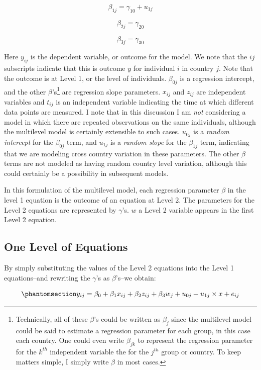 \documentclass[
  letterpaper,
  DIV=11,
  numbers=noendperiod]{scrreprt}
\begin{document}
\[\beta_{1j} = \gamma_{10} + u_{1j}\]

\[\beta_{2j} = \gamma_{20}\]

\[\beta_{3j} = \gamma_{30}\]

Here \(y_{ij}\) is the dependent variable, or outcome for the model. We
note that the \(ij\) subscripts indicate that this is outcome \(y\) for
individual \(i\) in country \(j\). Note that the outcome is at Level 1,
or the level of individuals. \(\beta_{0j}\) is a regression intercept,
and the other \(\beta\)'s\footnote{Technically, all of these \(\beta\)'s
  could be written as \(\beta_j\) since the multilevel model could be
  said to estimate a regression parameter for each group, in this case
  each country. One could even write \(\beta_{jk}\) to represent the
  regression parameter for the \(k^{th}\) independent variable the for
  the \(j^{th}\) group or country. To keep matters simple, I simply
  write \(\beta\) in most cases.} are regression slope parameters.
\(x_{ij}\) and \(z_{ij}\) are independent variables and \(t_{ij}\) is an
independent variable indicating the time at which different data points
are measured. I note that in this discussion I am \emph{not} considering
a model in which there are repeated observations on the same
individuals, although the multilevel model is certainly extensible to
such cases. \(u_{0j}\) is a \emph{random intercept} for the
\(\beta_{0j}\) term, and \(u_{1j}\) is a \emph{random slope} for the
\(\beta_{1j}\) term, indicating that we are modeling cross country
variation in these parameters. 
 The other \(\beta\) terms are not modeled as having
random country level variation, although this could certainly be a
possibility in subsequent models.

In this formulation of the multilevel model, each regression parameter
\(\beta\) in the level 1 equation is the outcome of an equation at Level
2. The parameters for the Level 2 equations are represented by
\(\gamma\)'s. \(w\) a Level 2 variable appears in the first Level 2
equation.

\subsection{One Level of Equations}\label{one-level-of-equations}

By simply substituting the values of the Level 2 equations into the
Level 1 equations--and rewriting the \(\gamma\)'s as \(\beta\)'s--we
obtain:

\begin{equation}\phantomsection\label{eq-MLM}{y_{ij} = \beta_0 + \beta_1 x_{ij} + \beta_2 z_{ij} + \beta_3 w_{j} + u_{0j} + u_{1j} \times x + e_{ij}}\end{equation}
\end{document}
